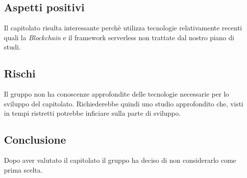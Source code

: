 \documentclass[../studio-di-fattibilita.tex]{subfiles}
\begin{document}
\subsection{Aspetti positivi}%
\label{sub:aspetti_positivi}
Il capitolato risulta interessante perchè utilizza tecnologie relativamente recenti quali la \textit{Blockchain}
e il \textit{}{framework serverless} non trattate dal nostro piano di studi.

\subsection{Rischi}%
\label{sub:rischi}
Il gruppo non ha conoscenze approfondite delle tecnologie necessarie per lo sviluppo del capitolato. Richiederebbe
quindi uno studio approfondito che, visti in tempi ristretti potrebbe inficiare sulla parte di sviluppo.

\subsection{Conclusione}%
\label{sub:conclusione}
Dopo aver valutato il capitolato il gruppo ha deciso di non considerarlo come prima scelta.
\end{document}
